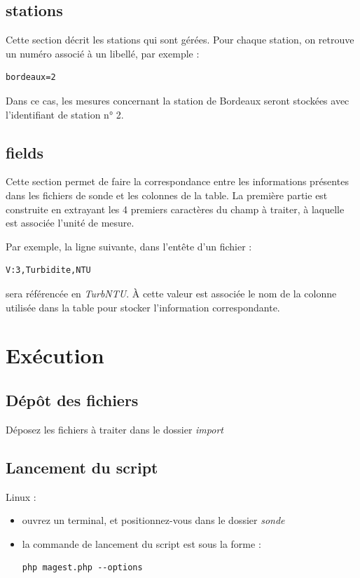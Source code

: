 \documentclass[12pt,a4paper]{article}
\begin{document}
\subsection{stations}

Cette section décrit les stations qui sont gérées. Pour chaque station, on retrouve un numéro associé à un libellé, par exemple :
\begin{lstlisting}
bordeaux=2
\end{lstlisting}


Dans ce cas, les mesures concernant la station de Bordeaux seront stockées avec l'identifiant de station n° 2.

\subsection{fields}
Cette section permet de faire la correspondance entre les informations présentes dans les fichiers de sonde et les colonnes de la table. La première partie est construite en extrayant les 4 premiers caractères du champ à traiter, à laquelle est associée l'unité de mesure.

Par exemple, la ligne suivante, dans l'entête d'un fichier :
\begin{lstlisting}
V:3,Turbidite,NTU
\end{lstlisting}

sera référencée en \textit{TurbNTU}. À cette valeur est associée le nom de la colonne utilisée dans la table pour stocker l'information correspondante.

\section{Exécution}
\subsection{Dépôt des fichiers}
Déposez les fichiers à traiter dans le dossier \textit{import}

\subsection{Lancement du script}

Linux :
\begin{itemize}
\item ouvrez un terminal, et positionnez-vous dans le dossier \textit{sonde}
\item la commande de lancement du script est sous la forme :
\begin{lstlisting}
php magest.php --options
\end{lstlisting}
\end{itemize}
\end{document}
